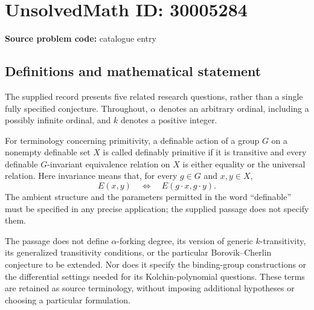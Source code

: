 \documentclass[11pt]{article}
\begin{document}
\section*{UnsolvedMath ID: 30005284}
\textbf{Source problem code:} catalogue entry
\subsection{Definitions and mathematical statement}
The supplied record presents five related research questions, rather than a single fully specified conjecture. Throughout, \(\alpha\) denotes an arbitrary ordinal, including a possibly infinite ordinal, and \(k\) denotes a positive integer.

For terminology concerning primitivity, a definable action of a group \(G\) on a nonempty definable set \(X\) is called definably primitive if it is transitive and every definable \(G\)-invariant equivalence relation on \(X\) is either equality or the universal relation. Here invariance means that, for every \(g\in G\) and \(x,y\in X\),
\[
E(x,y)\quad\Longleftrightarrow\quad E(g\cdot x,g\cdot y).
\]
The ambient structure and the parameters permitted in the word ``definable'' must be specified in any precise application; the supplied passage does not specify them.

The passage does not define \(\alpha\)-forking degree, its version of generic \(k\)-transitivity, its generalized transitivity conditions, or the particular Borovik--Cherlin conjecture to be extended. Nor does it specify the binding-group constructions or the differential settings needed for its Kolchin-polynomial questions. These terms are retained as source terminology, without imposing additional hypotheses or choosing a particular formulation.
\end{document}
